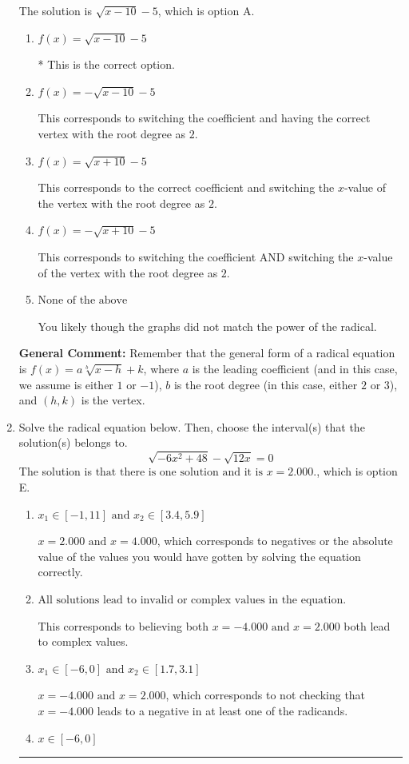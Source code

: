 \documentclass{extbook}[14pt]
\newcommand{\litem}[1]{\item #1

\rule{\textwidth}{0.4pt}}
\begin{document}
\begin{enumerate}
{The solution is \( \sqrt{x - 10} - 5 \), which is option A.\begin{enumerate}[label=\Alph*.]
\item \( f(x) = \sqrt{x - 10} - 5 \)

* This is the correct option.
\item \( f(x) = - \sqrt{x - 10} - 5 \)

This corresponds to switching the coefficient and having the correct vertex with the root degree as $2$.
\item \( f(x) = \sqrt{x + 10} - 5 \)

This corresponds to the correct coefficient and switching the $x$-value of the vertex with the root degree as $2$.
\item \( f(x) = - \sqrt{x + 10} - 5 \)

This corresponds to switching the coefficient AND switching the $x$-value of the vertex with the root degree as $2$.
\item \( \text{None of the above} \)

You likely though the graphs did not match the power of the radical.
\end{enumerate}

\textbf{General Comment:} Remember that the general form of a radical equation is $ f(x) = a \sqrt[b]{x - h} + k$, where $a$ is the leading coefficient (and in this case, we assume is either $1$ or $-1$), $b$ is the root degree (in this case, either $2$ or $3$), and $(h, k)$ is the vertex.
}
\litem{
Solve the radical equation below. Then, choose the interval(s) that the solution(s) belongs to.
\[ \sqrt{-6 x^2 + 48} - \sqrt{12 x} = 0 \]The solution is \( \text{that there is one solution and it is } x = 2.000. \), which is option E.\begin{enumerate}[label=\Alph*.]
\item \( x_1 \in [-1, 11] \text{ and } x_2 \in [3.4,5.9] \)

$x = 2.000 \text{ and } x = 4.000$, which corresponds to negatives or the absolute value of the values you would have gotten by solving the equation correctly.
\item \( \text{All solutions lead to invalid or complex values in the equation.} \)

This corresponds to believing both $x = -4.000 \text{ and } x = 2.000$ both lead to complex values.
\item \( x_1 \in [-6, 0] \text{ and } x_2 \in [1.7,3.1] \)

$x = -4.000 \text{ and } x = 2.000$, which corresponds to not checking that $x = -4.000$ leads to a negative in at least one of the radicands.
\item \( x \in [-6,0] \)


\end{enumerate}}
\end{enumerate}
\end{document}
